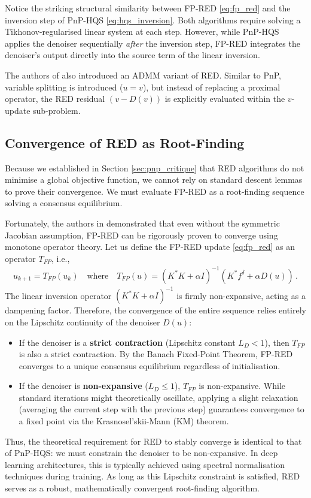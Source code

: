 Notice the striking structural similarity between FP-RED \eqref{eq:fp_red} and the inversion step of PnP-HQS \eqref{eq:hqs_inversion}. Both algorithms require solving a Tikhonov-regularised linear system at each step. However, while PnP-HQS applies the denoiser sequentially \emph{after} the inversion step, FP-RED integrates the denoiser's output directly into the source term of the linear inversion. 

The authors of \cite{romano2017little} also introduced an ADMM variant of RED. Similar to PnP, variable splitting is introduced ($u = v$), but instead of replacing a proximal operator, the RED residual $(v - D(v))$ is explicitly evaluated within the $v$-update sub-problem.

\subsection{Convergence of RED as Root-Finding}
\label{sec:red_convergence}

Because we established in Section \ref{sec:pnp_critique} that RED algorithms do not minimise a global objective function, we cannot rely on standard descent lemmas to prove their convergence. We must evaluate FP-RED as a root-finding sequence solving a consensus equilibrium.


Fortunately, the authors in \cite{reehorst2018regularization} demonstrated that even without the symmetric Jacobian assumption, FP-RED can be rigorously proven to converge using monotone operator theory. Let us define the FP-RED update \eqref{eq:fp_red} as an operator $T_{FP}$, i.e.,
\begin{align}
    u_{k+1} = T_{FP}(u_k) \quad \text{where} \quad T_{FP}(u) = (K^*K + \alpha I)^{-1} (K^* f^\delta + \alpha D(u)) \, .
\end{align}
The linear inversion operator $(K^*K + \alpha I)^{-1}$ is firmly non-expansive, acting as a dampening factor. Therefore, the convergence of the entire sequence relies entirely on the Lipschitz continuity of the denoiser $D(u)$:
\begin{itemize}
    \item If the denoiser is a \textbf{strict contraction} (Lipschitz constant $L_D < 1$), then $T_{FP}$ is also a strict contraction. By the Banach Fixed-Point Theorem, FP-RED converges to a unique consensus equilibrium regardless of initialisation.
    \item If the denoiser is \textbf{non-expansive} ($L_D \le 1$), $T_{FP}$ is non-expansive. While standard iterations might theoretically oscillate, applying a slight relaxation (averaging the current step with the previous step) guarantees convergence to a fixed point via the Krasnosel'skii-Mann (KM) theorem.
\end{itemize}
Thus, the theoretical requirement for RED to stably converge is identical to that of PnP-HQS: we must constrain the denoiser to be non-expansive. In deep learning architectures, this is typically achieved using spectral normalisation techniques during training. As long as this Lipschitz constraint is satisfied, RED serves as a robust, mathematically convergent root-finding algorithm.


